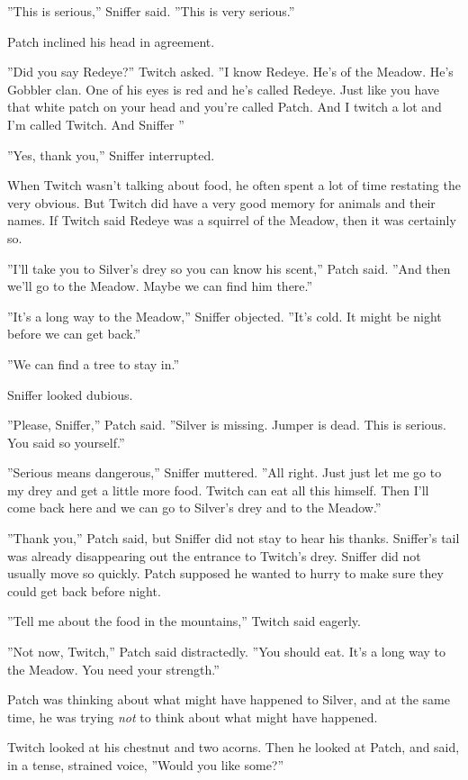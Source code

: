 \documentclass[11pt]{article}
\begin{document}
''This is serious,'' Sniffer said. ''This is very serious.''\par
Patch inclined his head in agreement.\par
''Did you say Redeye?'' Twitch asked. ''I know Redeye. He's of the Meadow. He's Gobbler clan. One of his eyes is red and he's called Redeye. Just like you have that white patch on your head and you're called Patch. And I twitch a lot and I'm called Twitch. And Sniffer %
''\par
''Yes, thank you,'' Sniffer interrupted.\par
When Twitch wasn't talking about food, he often spent a lot of time restating the very obvious. But Twitch did have a very good memory for animals and their names. If Twitch said Redeye was a squirrel of the Meadow, then it was certainly so.\par
''I'll take you to Silver's drey so you can know his scent,'' Patch said. ''And then we'll go to the Meadow. Maybe we can find him there.''\par
''It's a long way to the Meadow,'' Sniffer objected. ''It's cold. It might be night before we can get back.''\par
''We can find a tree to stay in.''\par
Sniffer looked dubious.\par
''Please, Sniffer,'' Patch said. ''Silver is missing. Jumper is dead. This is serious. You said so yourself.''\par
''Serious means dangerous,'' Sniffer muttered. ''All right. Just %
 just let me go to my drey and get a little more food. Twitch can eat all this himself. Then I'll come back here and we can go to Silver's drey and to the Meadow.''\par
''Thank you,'' Patch said, but Sniffer did not stay to hear his thanks. Sniffer's tail was already disappearing out the entrance to Twitch's drey. Sniffer did not usually move so quickly. Patch supposed he wanted to hurry to make sure they could get back before night.\par
''Tell me about the food in the mountains,'' Twitch said eagerly.\par
''Not now, Twitch,'' Patch said distractedly. ''You should eat. It's a long way to the Meadow. You need your strength.''\par
Patch was thinking about what might have happened to Silver, and at the same time, he was trying {\it not} to think about what might have happened.\par
Twitch looked at his chestnut and two acorns. Then he looked at Patch, and said, in a tense, strained voice, ''Would you like some?''\par
\end{document}
